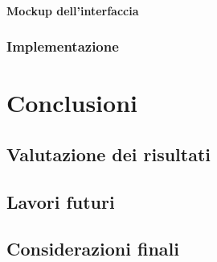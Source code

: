 \documentclass[%
  a4paper,                %
  12pt,                   %
  twoside,                %
  openright,              %
  titlepage,              %
  final                   %
]{scrbook}
\begin{document}
        \subsection{Mockup dell'interfaccia}
      \section{Implementazione}

  \part{Conclusioni}
    \chapter{Valutazione dei risultati}
    \chapter{Lavori futuri}
    \chapter{Considerazioni finali}

  \appendix
  

  \backmatter{}
  
  
\end{document}
